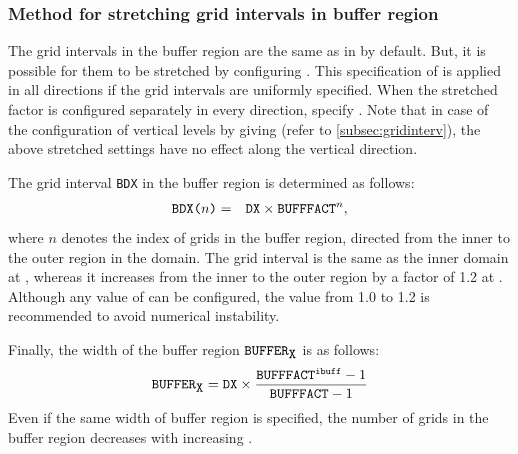 \subsubsection{Method for stretching grid intervals in buffer region}

The grid intervals in the buffer region are the same as  in  by default.
But, it is possible for them to be stretched by configuring . This specification of  is applied in all directions if the grid intervals are uniformly specified. When the stretched factor is configured separately in every direction, specify . Note that in case of the configuration of vertical levels by giving  (refer to \ref{subsec:gridinterv}), the above stretched settings have no effect along the vertical direction.

The grid interval \verb|BDX| in the buffer region is determined as follows:
\begin{eqnarray}
 \verb|BDX(|n\verb|)| &=& \verb|DX| \times \verb|BUFFFACT|^n, \nonumber
\end{eqnarray}
where $n$ denotes the index of grids in the buffer region, directed from the inner to the outer region in the domain. The grid interval is the same as the inner domain at , whereas it increases from the inner to the outer region by a factor of 1.2 at .  Although any value of  can be configured, the value from 1.0 to 1.2 is recommended to avoid numerical instability.

Finally, the width of the buffer region $\verb|BUFFER|_{\verb|X|}$ is as follows:
\begin{eqnarray}
  \verb|BUFFER|_{\verb|X|} = \nmitemeq{DX} \times \frac{ \nmitemeq{BUFFFACT}^{\texttt{\detokenize{ibuff}}}-1}{ \nmitemeq{BUFFFACT}-1 }
\end{eqnarray}
Even if the same width of buffer region  is specified, the number of grids in the buffer region decreases with increasing .
